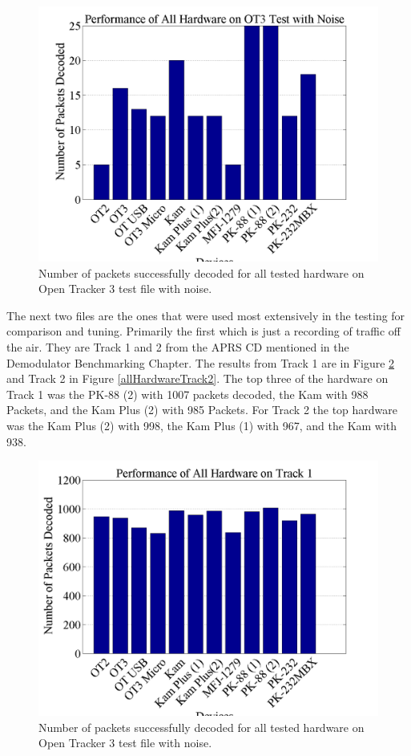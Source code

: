  \begin{figure}
  \centering
	\includegraphics[width=0.75\linewidth]{images/PerformanceofAllHardwareonOT3TestwithNoise.png} 
	\caption{Number of packets successfully decoded for all tested hardware on Open Tracker 3 test file with noise.}
   \label{allHardwareOT3Noise}
\end{figure}

The next two files are the ones that were used most extensively in the testing for comparison and tuning. Primarily the first which is just a recording of traffic off the air. They are Track 1 and 2 from the APRS CD mentioned in the Demodulator Benchmarking Chapter. The results from Track 1 are in Figure \ref{allHardwareTrack1} and Track 2 in Figure \ref{allHardwareTrack2}. The top three of the hardware on Track 1 was the PK-88 (2) with 1007 packets decoded, the Kam with 988 Packets, and the Kam Plus (2) with 985 Packets. For Track 2 the top hardware was the Kam Plus (2) with 998, the Kam Plus (1) with 967, and the Kam with 938.

 \begin{figure}
  \centering
	\includegraphics[width=0.75\linewidth]{images/PerformanceofAllHardwareonTrack1.png} 
	\caption{Number of packets successfully decoded for all tested hardware on Open Tracker 3 test file with noise.}
   \label{allHardwareTrack1}
\end{figure}

